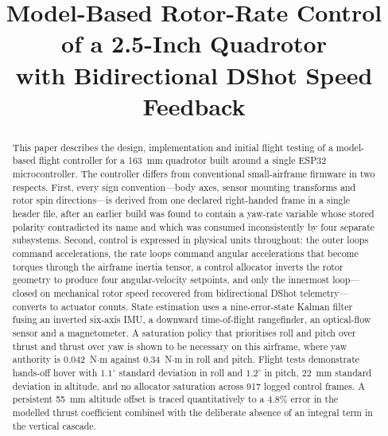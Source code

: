 \documentclass[conference]{IEEEtran}
\begin{document}
\title{Model-Based Rotor-Rate Control of a 2.5-Inch Quadrotor\\
with Bidirectional DShot Speed Feedback}

\author{
}

\maketitle

\begin{abstract}
This paper describes the design, implementation and initial flight testing of
a model-based flight controller for a 163~mm quadrotor built around a single
ESP32 microcontroller. The controller differs from conventional small-airframe
firmware in two respects. First, every sign convention---body axes, sensor
mounting transforms and rotor spin directions---is derived from one declared
right-handed frame in a single header file, after an earlier build was found
to contain a yaw-rate variable whose stored polarity contradicted its name and
which was consumed inconsistently by four separate subsystems. Second, control
is expressed in physical units throughout: the outer loops command
accelerations, the rate loops command angular accelerations that become
torques through the airframe inertia tensor, a control allocator inverts the
rotor geometry to produce four angular-velocity setpoints, and only the
innermost loop---closed on mechanical rotor speed recovered from bidirectional
DShot telemetry---converts to actuator counts. State estimation uses a
nine-error-state Kalman filter fusing an inverted six-axis IMU, a downward
time-of-flight rangefinder, an optical-flow sensor and a magnetometer.
A saturation policy that prioritises roll and pitch over thrust and thrust
over yaw is shown to be necessary on this airframe, where yaw authority is
0.042~N$\cdot$m against 0.34~N$\cdot$m in roll and pitch. Flight tests
demonstrate hands-off hover with $1.1^{\circ}$ standard deviation in roll and
$1.2^{\circ}$ in pitch, 22~mm standard deviation in altitude, and no allocator
saturation across 917 logged control frames. A persistent 55~mm altitude
offset is traced quantitatively to a 4.8\% error in the modelled thrust
coefficient combined with the deliberate absence of an integral term in the
vertical cascade.
\end{abstract}
\end{document}
